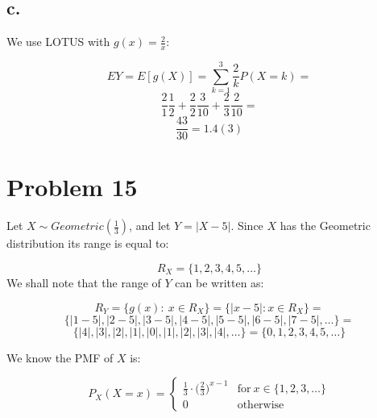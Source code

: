 \documentclass{article}
\begin{document}
\subsection*{c.}

We use LOTUS with \(g(x) = \frac{2}{x}\):

\begin{equation*}
    EY = E[g(X)] = \sum_{k=1}^{3}\frac{2}{k}P(X=k) = 
\end{equation*}
\begin{equation*}
    \frac{2}{1}\frac{1}{2} + \frac{2}{2}\frac{3}{10} + \frac{2}{3}\frac{2}{10} =
\end{equation*}
\begin{equation*}
    \frac{43}{30} = 1.4(3)
\end{equation*}

\section*{Problem 15}

Let \(X \sim Geometric(\frac{1}{3})\), and let \(Y = |X - 5|\). Since \(X\) has the Geometric distribution
its range is equal to:

\begin{equation*}
    R_{X} = \{1, 2, 3, 4, 5, \dots\}
\end{equation*}
We shall note that the range of \(Y\) can be written as:

\begin{equation*}
    R_{Y} = \{g(x): \ x \in R_{X}\} = \{|x - 5|: x \in R_{X} \} = 
\end{equation*}
\begin{equation*}
    \{|1-5|, |2-5|, |3-5|, |4-5|, |5-5|, |6-5|, |7-5|, \dots\} =
\end{equation*}
\begin{equation*}
    \{|4|, |3|, |2|, |1|, |0|, |1|, |2|, |3|, |4|, \dots\} = \{0, 1, 2, 3, 4, 5, \dots\}
\end{equation*}

We know the PMF of \(X\) is: 

\begin{equation*}
    P_{X}(X = x) =
    \begin{cases}
        \frac{1}{3} \cdot \Big(\frac{2}{3}\Big)^{x-1}  & \mbox{for} \ x \in \{1, 2, 3, \dots\} \\
        0 & \mbox{otherwise} 
    \end{cases}
\end{equation*}
\end{document}
